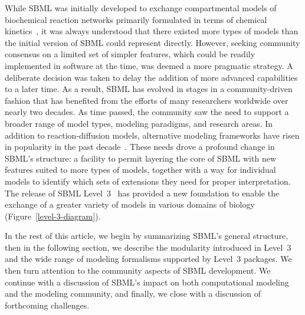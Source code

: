\documentclass{sbml-paper}
\begin{document}
While SBML was initially developed to exchange compartmental models of biochemical reaction networks primarily formulated in terms of chemical kinetics~\citep{hucka_2002}, it was always understood that there existed more types of models than the initial version of SBML could represent directly. However, seeking community consensus on a limited set of simpler features, which could be readily implemented in software at the time, was deemed a more pragmatic strategy. A deliberate decision was taken to delay the addition of more advanced capabilities to a later time.  As a result, SBML has evolved in stages in a community-driven fashion that has benefited from the efforts of many researchers worldwide over nearly two decades.  As time passed, the community saw the need to support a broader range of model types, modeling paradigms, and research areas. In addition to reaction-diffusion models, alternative modeling frameworks have risen in popularity in the past decade~\citep{Machado2011modelinga}. These needs drove a profound change in SBML's structure: a facility to permit layering the core of SBML with new features suited to more types of models, together with a way for individual models to identify which sets of extensions they need for proper interpretation.  The release of SBML Level~3~\citep{Hucka2010a} has provided a new foundation to enable the exchange of a greater variety of models in various domains of biology (Figure~\ref{level-3-diagram}).

In the rest of this article, we begin by summarizing SBML's general structure, then in the following section, we describe the modularity introduced in Level~3 and the wide range of modeling formalisms supported by Level~3 packages.  We then turn attention to the community aspects of SBML development.  We continue with a discussion of SBML's impact on both computational modeling and the modeling community, and finally, we close with a discussion of forthcoming challenges.
\end{document}
